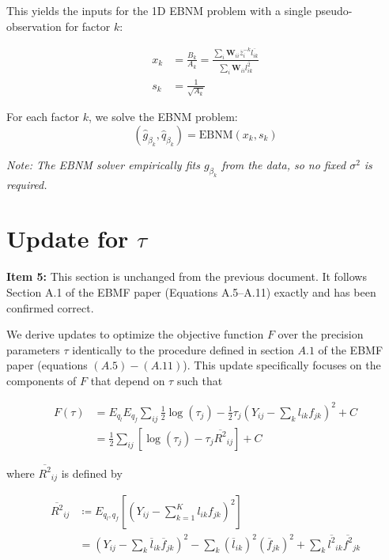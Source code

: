 \documentclass{article}[12pt]
\begin{document}
This yields the inputs for the 1D EBNM problem with a single pseudo-observation for factor $k$:

\begin{align}
    x_k &= \frac{B_k}{A_k} = \frac{\sum_i \mathbf{W}_{ii} \overline{z}^{-k}_{i} \overline{l_{ik}}}{\sum_i \mathbf{W}_{ii} \overline{l_{ik}^2}}\label{eq:xk-beta} \\
    s_k &= \frac{1}{\sqrt{A_k}}\label{eq:sk-beta}
\end{align}

For each factor $k$, we solve the EBNM problem:
\begin{equation}
    (\hat{g}_{\beta_k}, \hat{q}_{\beta_k}) = \text{EBNM}(x_k, s_k)
\end{equation}

\textit{Note: The EBNM solver empirically fits $g_{\beta_k}$ from the data, so no fixed $\sigma^2$ is required.}

\section{Update for $\tau$}

\begin{corrbox}
\textbf{Item 5:} This section is unchanged from the previous document. It follows
Section A.1 of the EBMF paper (Equations A.5--A.11) exactly and has been
confirmed correct.
\end{corrbox}

\medskip
We derive updates to optimize the objective function $F$ over the precision parameters $\tau$ identically to the procedure defined in section $A.1$ of the EBMF paper (equations $(A.5)-(A.11)$). This update specifically focuses on the components of $F$ that depend on $\tau$ such that

\begin{align}
    F\left(\tau\right) &= E_{q_{l}}E_{q_{f}}\sum_{ij}\frac{1}{2}\log\left(\tau_{j}\right) - \frac{1}{2}\tau_{j}\left(Y_{ij}-\sum_{k}l_{ik}f_{jk}\right)^2 + C\\
    &= \frac{1}{2}\sum_{ij}\left[\log\left(\tau_{j}\right) - \tau_{j}\overline{R^2}_{ij}\right] + C
\end{align}

where $\overline{R^2}_{ij}$ is defined by

\begin{align}
    \overline{R^2}_{ij} &\coloneq E_{q_l, q_f}\left[\left(Y_{ij} - \sum_{k=1}^{K}l_{ik}f_{jk}\right)^2\right]\\
    &= \left(Y_{ij} - \sum_{k}\overline{l}_{ik}\overline{f}_{jk}\right)^2 - \sum_{k}\left(\overline{l}_{ik}\right)^2\left(\overline{f}_{jk}\right)^2 + \sum_{k}\overline{l^{2}}_{ik}\overline{f^{2}}_{jk}
\end{align}
\end{document}
